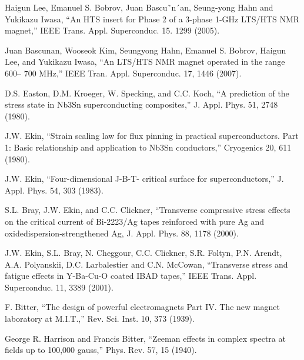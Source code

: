 \noindent [3.58] Haigun Lee, Emanuel S. Bobrov, Juan Bascu˜n´an, Seung-yong Hahn and Yukikazu Iwasa, ``An HTS insert for Phase 2 of a 3-phase 1-GHz LTS/HTS NMR magnet,” IEEE Trans. Appl. Superconduc. 15. 1299 (2005).

\noindent [3.59] Juan Bascunan, Wooseok Kim, Seungyong Hahn, Emanuel S. Bobrov, Haigun Lee, and Yukikazu Iwasa, ``An LTS/HTS NMR magnet operated in the range 600–
700 MHz,” IEEE Tran. Appl. Superconduc. 17, 1446 (2007).

\noindent [3.60] D.S. Easton, D.M. Kroeger, W. Specking, and C.C. Koch, ``A prediction of the
stress state in Nb3Sn superconducting composites,” J. Appl. Phys. 51, 2748 (1980).

\noindent [3.61] J.W. Ekin, ``Strain scaling law for flux pinning in practical superconductors. Part 1: Basic relationship and application to Nb3Sn conductors,” Cryogenics 20, 611
(1980).

\noindent [3.62] J.W. Ekin, ``Four-dimensional J-B-T- critical surface for superconductors,” J. Appl. Phys. 54, 303 (1983).

\noindent [3.63] S.L. Bray, J.W. Ekin, and C.C. Clickner, ``Transverse compressive stress effects
on the critical current of Bi-2223/Ag tapes reinforced with pure Ag and oxidedispersion-strengthened Ag, J. Appl. Phys. 88, 1178 (2000).

\noindent [3.64] J.W. Ekin, S.L. Bray, N. Cheggour, C.C. Clickner, S.R. Foltyn, P.N. Arendt,
A.A. Polyanskii, D.C. Larbalestier and C.N. McCowan, ``Transverse stress and
fatigue effects in Y-Ba-Cu-O coated IBAD tapes,” IEEE Trans. Appl. Superconduc.
11, 3389 (2001).

\noindent [3.65] F. Bitter, ``The design of powerful electromagnets Part IV. The new magnet laboratory at M.I.T.,” Rev. Sci. Inst. 10, 373 (1939).

\noindent [3.66] George R. Harrison and Francis Bitter, ``Zeeman effects in complex spectra at fields up to 100,000 gauss,” Phys. Rev. 57, 15 (1940).

